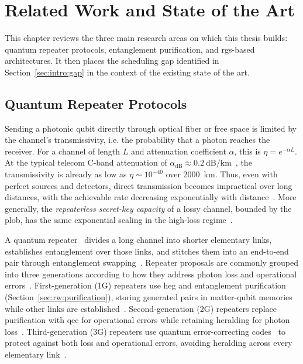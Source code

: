 \chapter{Related Work and State of the Art}
\label{chap:related}

This chapter reviews the three main research areas on which this thesis builds: quantum repeater protocols, entanglement purification, and \Gls{rgs}-based architectures. It then places the scheduling gap identified in Section~\ref{sec:intro:gap} in the context of the existing state of the art.

\section{Quantum Repeater Protocols}
\label{sec:rw:repeaters}

Sending a photonic qubit directly through optical fiber or free space is limited by the channel's transmissivity, i.e. the probability that a photon reaches the receiver. For a channel of length $L$ and attenuation coefficient $\alpha$, this is $\eta=e^{-\alpha L}$. At the typical telecom C-band attenuation of $\alpha_{\mathrm{dB}}\approx0.2~\mathrm{dB/km}$~\cite{ITUT2024Cable}, the transmissivity is already as low as $\eta\sim10^{-40}$ over 2000~km. Thus, even with perfect sources and detectors, direct transmission becomes impractical over long distances, with the achievable rate decreasing exponentially with distance~\cite{Sangouard2011Quantum}. More generally, the \emph{repeaterless secret-key capacity} of a lossy channel, bounded by the \Gls{plob}, has the same exponential scaling in the high-loss regime~\cite{Pirandola2017Fundamental,Pant2017Ratedistance,Azuma2023Quantum}.

A quantum repeater~\cite{Briegel1998Quantum} divides a long channel into shorter elementary links, establishes entanglement over those links, and stitches them into an end-to-end pair through entanglement swapping~\cite{Zukowski1993Eventreadydetectors,Grudka2008Entanglementswapping}. Repeater proposals are commonly grouped into three generations according to how they address photon loss and operational errors~\cite{Muralidharan2016Efficient,Azuma2023Quantum}. First-generation (1G) repeaters use \Gls{heg} and entanglement purification~\cite{Bennett1996Purification,Deutsch1996Quantum} (Section~\ref{sec:rw:purification}), storing generated pairs in matter-qubit memories while other links are established~\cite{Briegel1998Quantum,Duan2001Longdistance}. Second-generation (2G) repeaters replace purification with \Gls{qec} for operational errors while retaining heralding for photon loss~\cite{Jiang2009Quantum,Wo2023Resourceefficient}. Third-generation (3G) repeaters use quantum error-correcting codes~\cite{Knill2000Theory,Gottesman1997Stabilizer} to protect against both loss and operational errors, avoiding heralding across every elementary link~\cite{Fowler2010Surface,Azuma2015All}.

